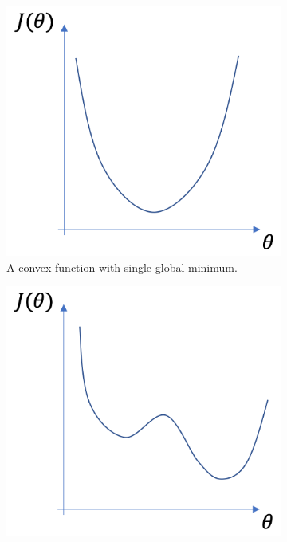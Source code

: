 \begin{figure}[h]
    \centering
    \begin{subfigure}[b]{0.3\textwidth}
        \includegraphics[width=\textwidth]{figures/convex_function.png}
        \caption{A convex function with single global minimum.}
        \label{fig:convex}
    \end{subfigure}
    \hfill %
    \begin{subfigure}[b]{0.3\textwidth}
        \includegraphics[width=\textwidth]{figures/non_convex_function.png}

\end{subfigure}
\end{figure}

